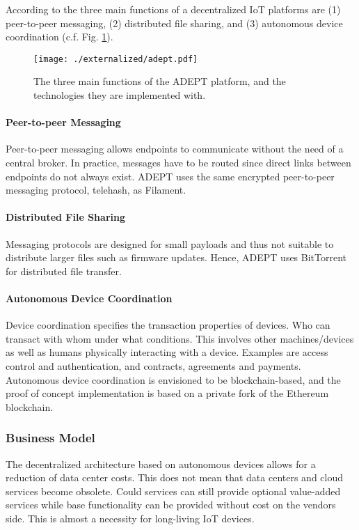 According to \cite{empoweringtheedge} the three main functions of a decentralized IoT platforms are (1) peer-to-peer messaging, (2) distributed file sharing, and (3) autonomous device coordination (c.f. Fig. \ref{fig:adept}). 

\begin{figure}
\centering
\texttt{[image: ./externalized/adept.pdf]}
\caption{The three main functions of the ADEPT platform, and the technologies they are implemented with.}
\label{fig:adept}
\end{figure}

\paragraph{Peer-to-peer Messaging}

Peer-to-peer messaging allows endpoints to communicate without the need of a central broker. In practice, messages have to be routed since direct links between endpoints do not always exist. ADEPT uses the same encrypted peer-to-peer messaging protocol, telehash, as Filament. 

\paragraph{Distributed File Sharing}

Messaging protocols are designed for small payloads and thus not suitable to distribute larger files such as firmware updates. Hence, ADEPT uses BitTorrent for distributed file transfer.

\paragraph{Autonomous Device Coordination}
Device coordination specifies the transaction properties of devices. Who can transact with whom under what conditions. This involves other machines/devices as well as humans physically interacting with a device. Examples are access control and authentication, and contracts, agreements and payments. Autonomous device coordination is envisioned to be blockchain-based, and the proof of concept implementation is based on a private fork of the Ethereum blockchain. 

\subsubsection{Business Model}

The decentralized architecture based on autonomous devices allows for a reduction of data center costs. This does not mean that data centers and cloud services become obsolete. Could services can still provide optional value-added services while base functionality can be provided without cost on the vendors side. This is almost a necessity for long-living IoT devices.



